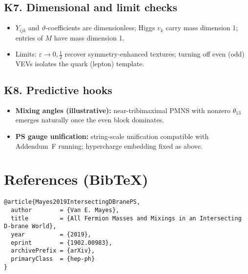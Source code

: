 \documentclass[11pt]{article}
\begin{document}
  \subsection*{K7. Dimensional and limit checks}
      \begin{itemize}
      \item $Y_{ijk}$ and $\vartheta$-coefficients are dimensionless; Higgs $v_k$ carry mass dimension 1; entries of $M$ have mass dimension 1.
      \item Limits: $\varepsilon\to 0,\tfrac12$ recover symmetry-enhanced textures; turning off even (odd) VEVs isolates the quark (lepton) template.
      \end{itemize}

  \subsection*{K8. Predictive hooks}
      \begin{itemize}
      \item \textbf{Mixing angles (illustrative):} near-tribimaximal PMNS with nonzero $\theta_{13}$ emerges naturally once the even block dominates.
      \item \textbf{PS gauge unification:} string-scale unification compatible with Addendum~F running; hypercharge embedding fixed as above.
      \end{itemize}

  \section*{References (Bib\TeX)}
  \begin{verbatim}
@article{Mayes2019IntersectingDBranePS,
  author        = {Van E. Mayes},
  title         = {All Fermion Masses and Mixings in an Intersecting D-brane World},
  year          = {2019},
  eprint        = {1902.00983},
  archivePrefix = {arXiv},
  primaryClass  = {hep-ph}
}
  \end{verbatim}




  \ifdefined\standalonechapter\else
  
  
\end{document}
